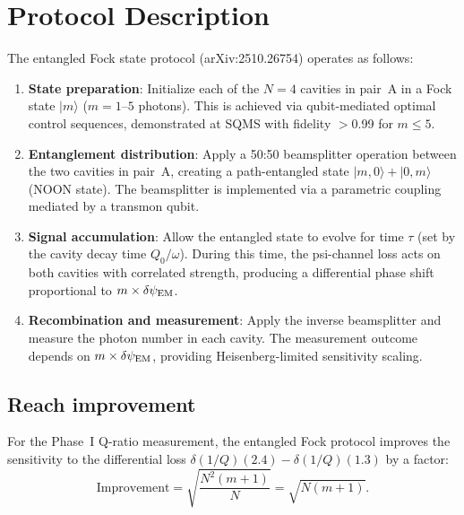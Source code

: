 \documentclass[11pt]{article}
\theoremstyle{definition}
\theoremstyle{remark}
\begin{document}
\section{Protocol Description}
\label{sec:fock_protocol}

The entangled Fock state protocol (arXiv:2510.26754) operates as follows:

\begin{enumerate}
\item \textbf{State preparation}: Initialize each of the $N = 4$
  cavities in pair~A in a Fock state $|m\rangle$ ($m = 1$--$5$
  photons). This is achieved via qubit-mediated optimal control
  sequences, demonstrated at SQMS with fidelity $>$0.99 for $m \leq 5$.

\item \textbf{Entanglement distribution}: Apply a 50:50 beamsplitter
  operation between the two cavities in pair~A, creating a path-entangled
  state $|m,0\rangle + |0,m\rangle$ (NOON state). The beamsplitter is
  implemented via a parametric coupling mediated by a transmon qubit.

\item \textbf{Signal accumulation}: Allow the entangled state to evolve
  for time $\tau$ (set by the cavity decay time $Q_0/\omega$). During
  this time, the psi-channel loss acts on both cavities with correlated
  strength, producing a differential phase shift proportional to
  $m \times \delta\psi_{\rm EM}$.

\item \textbf{Recombination and measurement}: Apply the inverse
  beamsplitter and measure the photon number in each cavity. The
  measurement outcome depends on $m \times \delta\psi_{\rm EM}$,
  providing Heisenberg-limited sensitivity scaling.
\end{enumerate}

\subsection{Reach improvement}

For the Phase~I Q-ratio measurement, the entangled Fock protocol
improves the sensitivity to the differential loss
$\delta(1/Q)(2.4) - \delta(1/Q)(1.3)$ by a factor:
\begin{equation}
\text{Improvement} = \sqrt{\frac{N^2(m+1)}{N}} = \sqrt{N(m+1)}.
\end{equation}
\end{document}
